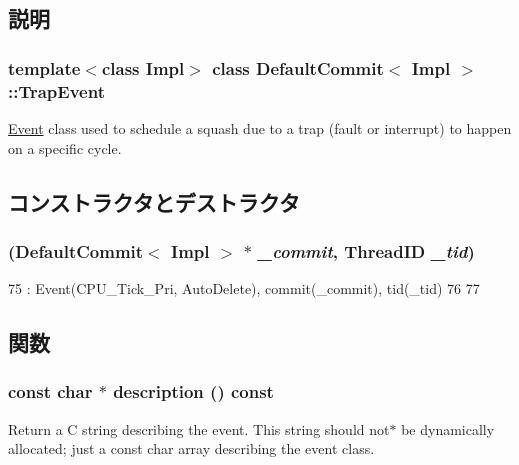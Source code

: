\subsection{説明}
\subsubsection*{template$<$class Impl$>$ class DefaultCommit$<$ Impl $>$::TrapEvent}

\hyperlink{classEvent}{Event} class used to schedule a squash due to a trap (fault or interrupt) to happen on a specific cycle. 

\subsection{コンストラクタとデストラクタ}
\hypertarget{classDefaultCommit_1_1TrapEvent_aac9789c38c08cd80f1a477b319c3ca6e}{
\subsubsection[{TrapEvent}]{ ({\bf DefaultCommit}$<$ Impl $>$ $\ast$ {\em \_\-commit}, \/  {\bf ThreadID} {\em \_\-tid})}}
\label{classDefaultCommit_1_1TrapEvent_aac9789c38c08cd80f1a477b319c3ca6e}



\begin{DoxyCode}
75     : Event(CPU_Tick_Pri, AutoDelete), commit(_commit), tid(_tid)
76 {
77 }
\end{DoxyCode}


\subsection{関数}
\hypertarget{classDefaultCommit_1_1TrapEvent_a5a14fe478e2393ff51f02e9b7be27e00}{
\subsubsection[{description}]{\setlength{\rightskip}{0pt plus 5cm}const char $\ast$ description () const}}
\label{classDefaultCommit_1_1TrapEvent_a5a14fe478e2393ff51f02e9b7be27e00}
Return a C string describing the event. This string should not$\ast$ be dynamically allocated; just a const char array describing the event class. 

